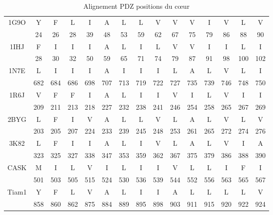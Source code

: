     \begin{table}[!htbp]
      \centering

     \caption{Alignement PDZ positions du cœur}   

      \begin{tabular}{ccccccccccccccc}

        \toprule

        \cmidrule{1-15}
   
          
1G9O & Y & F & L & I & A & L & L & V & V & V & I & V & L & V \\
     & 24 & 26 & 28 & 39 & 48 & 53 & 59 & 62 & 67 & 75 & 79 & 86 & 88 & 90 \\ 
1IHJ & F & I & I & I & A & L & I & L & V & V & I & I & L & I \\ 
     & 28 & 30 & 32 & 50 & 59 & 65 & 71 & 74 & 79 & 87 & 91 & 98 & 100 & 102 \\ 
1N7E & L & I & I & I & A & I & I & I & L & A & L & V & L & I \\
     & 682 & 684 & 686 & 698 & 707 & 713 & 719 & 722 & 727 & 735 & 739 & 746 & 748 & 750 \\ 
1R6J & V & F & F & I & A & L & I & I & V & I & L & V & I & I \\ 
     & 209 & 211 & 213 & 218 & 227 & 232 & 238 & 241 & 246 & 254 & 258 & 265 & 267 & 269 \\ 
2BYG & L & F & I & V & A & L & L & V & L & A & L & V & L & V \\ 
     & 203 & 205 & 207 & 224 & 233 & 239 & 245 & 248 & 253 & 261 & 265 & 272 & 274 & 276 \\ 
3K82 & L & F & I & I & A & L & I & V & L & A & L & V & I & A \\ 
     & 323 & 325 & 327 & 338 & 347 & 353 & 359 & 362 & 367 & 375 & 379 & 386 & 388 & 390 \\ 
CASK & M & I & L & V & I & L & I & I & V & L & L & I & F & I \\ 
     & 501 & 503 & 505 & 515 & 524 & 530 & 536 & 539 & 544 & 552 & 556 & 563 & 565 & 567 \\ 
Tiam1 & Y & F & L & V & A & L & I & I & A & L & L & L & L & V \\ 
      & 858 & 860 & 862 & 875 & 884 & 889 & 895 & 898 & 903 & 911 & 915 & 920 & 922 & 924 \\
          
   \bottomrule



   \end{tabular}     
\label{tab:corePDZ}      
    \end{table}



